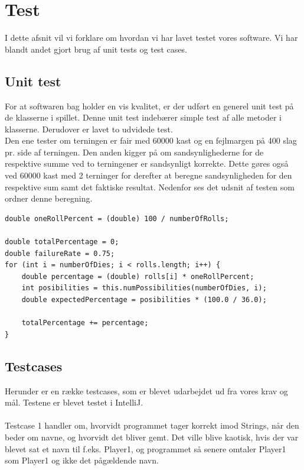 \chapter{Test}

I dette afsnit vil vi forklare om hvordan vi har lavet testet vores software.
Vi har blandt andet gjort brug af unit tests og test cases.

\section{Unit test}

For at softwaren bag holder en vis kvalitet, er der udført en generel unit test på de klasserne i spillet.
Denne unit test indebærer simple test af alle metoder i klasserne.
Derudover er lavet to udvidede test.
\\
Den ene tester om terningen er fair med 60000 kast og en fejlmargen på 400 slag pr. side af terningen.
Den anden kigger på om sandsynlighederne for de respektive summe ved to terningener er sandsynligt korrekte.
Dette gøres også ved 60000 kast med 2 terninger for derefter at beregne sandsynligheden for den respektive sum samt det faktiske resultat.
Nedenfor ses det udsnit af testen som ordner denne beregning.
\\

\begin{lstlisting}
double oneRollPercent = (double) 100 / numberOfRolls;
    
double totalPercentage = 0;
double failureRate = 0.75;
for (int i = numberOfDies; i < rolls.length; i++) {
    double percentage = (double) rolls[i] * oneRollPercent;
    int posibilities = this.numPossibilities(numberOfDies, i);
    double expectedPercentage = posibilities * (100.0 / 36.0);

    totalPercentage += percentage;
}
\end{lstlisting}
\newpage
\section{Testcases}
Herunder er en række testcases, som er blevet udarbejdet ud fra vores krav og mål.
Testene er blevet testet i IntelliJ.
\\\\Testcase 1 handler om, hvorvidt programmet tager korrekt imod Strings, når den beder om navne, og hvorvidt det bliver gemt.
Det ville blive kaotisk, hvis der var blevet sat et navn til f.eks. Player1, og programmet så senere omtaler Player1 som Player1 og ikke det pågældende navn.

